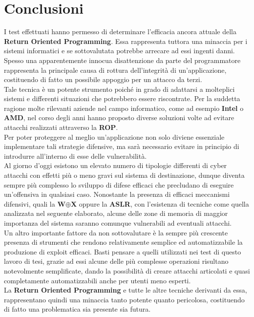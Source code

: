 \chapter{Conclusioni}
\label{chap:Conclusion}
I test effettuati hanno permesso di determinare l'efficacia ancora attuale della \textbf{Return Oriented Programming}. Essa rappresenta tuttora una minaccia per i sistemi informatici 
e se sottovalutata potrebbe arrecare ad essi ingenti danni.\\
Spesso una apparentemente innocua disattenzione da parte del programmatore rappresenta la principale causa di rottura dell'integrità di un'applicazione, 
costituendo di fatto un possibile appoggio per un attacco da terzi.\\Tale tecnica è un potente strumento poiché in grado di adattarsi a molteplici sistemi e differenti situazioni che potrebbero essere riscontrate. 
Per la suddetta ragione molte rilevanti aziende nel campo informatico, come ad esempio \textbf{Intel} o \textbf{AMD}, nel corso degli anni hanno proposto diverse soluzioni volte ad evitare attacchi realizzati attraverso la \textbf{ROP}.\\
Per poter proteggere al meglio un'applicazione non solo diviene essenziale implementare tali strategie difensive, ma sarà necessario evitare in principio di introdurre all'interno di esse delle vulnerabilità.\\
Al giorno d'oggi esistono un elevato numero di tipologie differenti di cyber attacchi con effetti più o meno gravi sul sistema di destinazione, dunque diventa sempre più complesso lo sviluppo di difese efficaci 
che precludano di eseguire un'offensiva in qualsiasi caso. Nonostante la presenza di efficaci meccanismi difensivi, quali la \textbf{W$\oplus$X} oppure la \textbf{ASLR}, con l'esistenza di tecniche come quella
analizzata nel seguente elaborato, alcune delle zone di memoria di maggior importanza del sistema saranno comunque vulnerabili ad eventuali attacchi.\\
Un altro importante fattore da non sottovalutare è la sempre più crescente presenza di strumenti che rendono relativamente semplice ed automatizzabile la produzione di exploit efficaci. Basti pensare a quelli utilizzati nei
test di questo lavoro di tesi, grazie ad essi alcune delle più complesse operazioni risultano notevolmente semplificate, dando la possibilità di creare attacchi articolati e quasi completamente automatizzabili anche per utenti meno esperti.\\
La \textbf{Return Oriented Programming} e tutte le altre tecniche derivanti da essa, rappresentano quindi una minaccia tanto potente quanto pericolosa, costituendo di fatto una problematica sia presente sia futura.\\
